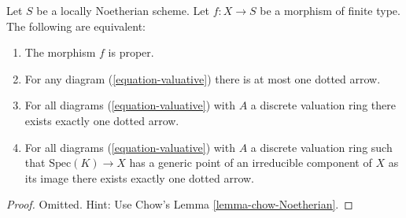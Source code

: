 \begin{lemma}
\label{lemma-Noetherian-dvr-valuative-proper}
Let $S$ be a locally Noetherian scheme.
Let $f : X \to S$ be a morphism of finite type.
The following are equivalent:
\begin{enumerate}
\item The morphism $f$ is proper.
\item For any diagram (\ref{equation-valuative}) there is at most
one dotted arrow.
\item For all diagrams (\ref{equation-valuative}) with $A$ a discrete
valuation ring there exists exactly one dotted arrow.
\item For all diagrams (\ref{equation-valuative}) with $A$ a discrete
valuation ring such that $\text{Spec}(K) \to X$ has a generic
point of an irreducible component of $X$ as its image there exists exactly
one dotted arrow.
\end{enumerate}
\end{lemma}

\begin{proof}
Omitted. Hint: Use Chow's Lemma \ref{lemma-chow-Noetherian}.
\end{proof}




















